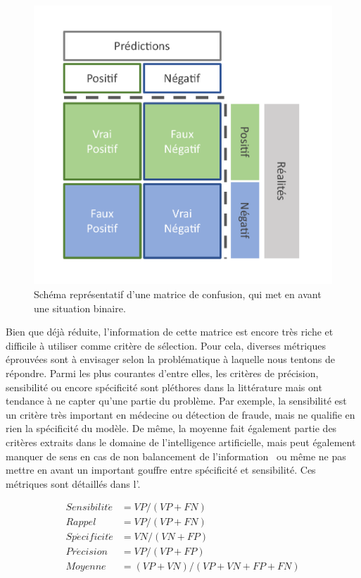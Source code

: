 \begin{figure}[H]
    \centering
    \includegraphics[width=0.55\linewidth]{contents/chapter_3/resources/scheme_confusion_matrix.pdf}
    \caption{Schéma représentatif d’une matrice de confusion, qui met en avant une situation binaire.}
    \label{fig:scheme_confusion_matrix}
\end{figure}

Bien que déjà réduite, l'information de cette matrice est encore très riche et difficile à utiliser comme critère de sélection. Pour cela, diverses métriques éprouvées sont à envisager selon la problématique à laquelle nous tentons de répondre. Parmi les plus courantes d'entre elles, les critères de précision, sensibilité ou encore spécificité sont pléthores dans la littérature mais ont tendance à ne capter qu'une partie du problème. Par exemple, la sensibilité est un critère très important en médecine ou détection de fraude, mais ne qualifie en rien la spécificité du modèle. De même, la moyenne fait également partie des critères extraits dans le domaine de l'intelligence artificielle, mais peut également manquer de sens en cas de non balancement de l'information~\cite{Guo2008} ou même ne pas mettre en avant un important gouffre entre spécificité et sensibilité. Ces métriques sont détaillés dans l'.\par

\begin{equation} 
    \label{eq:metrics_basics}
    \begin{split}
    Sensibilit\acute{e} &= VP/(VP+FN) \\
    Rappel &= VP/(VP+FN) \\	
    Sp\acute{e}cificit\acute{e} &=  VN/(VN+FP) \\
    Pr\acute{e}cision &= VP/(VP+FP) \\
    Moyenne &= (VP+VN)/(VP+VN+FP+FN)
    \end{split}
\end{equation}

